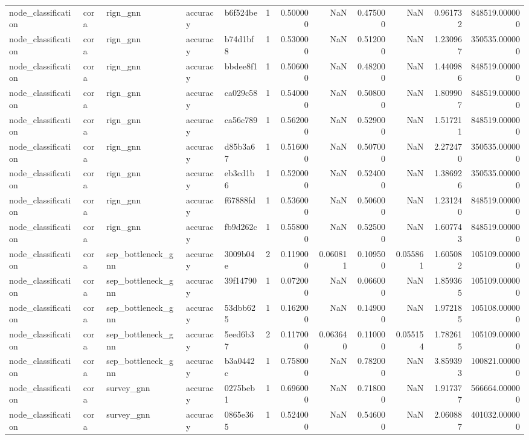 \begin{tabular}{lllllrrrrrrr}
node_classification & cora & rign_gnn & accuracy & b6f524be & 1 & 0.500000 & NaN & 0.475000 & NaN & 0.961732 & 848519.000000 \\
node_classification & cora & rign_gnn & accuracy & b74d1bf8 & 1 & 0.530000 & NaN & 0.512000 & NaN & 1.230967 & 350535.000000 \\
node_classification & cora & rign_gnn & accuracy & bbdee8f1 & 1 & 0.506000 & NaN & 0.482000 & NaN & 1.440986 & 848519.000000 \\
node_classification & cora & rign_gnn & accuracy & ca029c58 & 1 & 0.540000 & NaN & 0.508000 & NaN & 1.809907 & 848519.000000 \\
node_classification & cora & rign_gnn & accuracy & ca56c789 & 1 & 0.562000 & NaN & 0.529000 & NaN & 1.517211 & 848519.000000 \\
node_classification & cora & rign_gnn & accuracy & d85b3a67 & 1 & 0.516000 & NaN & 0.507000 & NaN & 2.272470 & 350535.000000 \\
node_classification & cora & rign_gnn & accuracy & eb3cd1b6 & 1 & 0.520000 & NaN & 0.524000 & NaN & 1.386926 & 350535.000000 \\
node_classification & cora & rign_gnn & accuracy & f67888fd & 1 & 0.536000 & NaN & 0.506000 & NaN & 1.231240 & 848519.000000 \\
node_classification & cora & rign_gnn & accuracy & fb9d262c & 1 & 0.558000 & NaN & 0.525000 & NaN & 1.607743 & 848519.000000 \\
node_classification & cora & sep_bottleneck_gnn & accuracy & 3009b04e & 2 & 0.119000 & 0.060811 & 0.109500 & 0.055861 & 1.605082 & 105109.000000 \\
node_classification & cora & sep_bottleneck_gnn & accuracy & 39f14790 & 1 & 0.072000 & NaN & 0.066000 & NaN & 1.859365 & 105109.000000 \\
node_classification & cora & sep_bottleneck_gnn & accuracy & 53dbb625 & 1 & 0.162000 & NaN & 0.149000 & NaN & 1.972185 & 105108.000000 \\
node_classification & cora & sep_bottleneck_gnn & accuracy & 5eed6b37 & 2 & 0.117000 & 0.063640 & 0.110000 & 0.055154 & 1.782615 & 105109.000000 \\
node_classification & cora & sep_bottleneck_gnn & accuracy & b3a0442c & 1 & 0.758000 & NaN & 0.782000 & NaN & 3.859393 & 100821.000000 \\
node_classification & cora & survey_gnn & accuracy & 0275beb1 & 1 & 0.696000 & NaN & 0.718000 & NaN & 1.917377 & 566664.000000 \\
node_classification & cora & survey_gnn & accuracy & 0865e365 & 1 & 0.524000 & NaN & 0.546000 & NaN & 2.060887 & 401032.000000 \\

\end{tabular}

